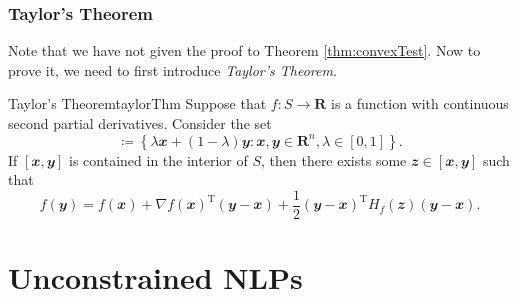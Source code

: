 \documentclass[math, code]{amznotes}
\theoremstyle{remark}
\begin{document}
\subsection{Taylor's Theorem}
Note that we have not given the proof to Theorem \ref{thm:convexTest}. Now to prove it, we need to first introduce \textit{Taylor's Theorem}.
\begin{thmbox}{Taylor's Theorem}{taylorThm}
    Suppose that $f \colon S \to \mathbf{R}$ is a function with continuous second partial derivatives. Consider the set
    \begin{displaymath}
        [\mathbfit{x}, \mathbfit{y}] \coloneqq \left\{\lambda\mathbfit{x} + (1 - \lambda)\mathbfit{y} \colon \mathbfit{x}, \mathbfit{y} \in \mathbf{R}^n, \lambda \in [0, 1]\right\}.
    \end{displaymath}
    If $[\mathbfit{x}, \mathbfit{y}]$ is contained in the interior of $S$, then there exists some $\mathbfit{z} \in [\mathbfit{x}, \mathbfit{y}]$ such that
    \begin{equation*}
        f(\mathbfit{y}) = f(\mathbfit{x}) + \nabla f(\mathbfit{x})^{\mathrm{T}}(\mathbfit{y - x}) + \frac{1}{2}(\mathbfit{y - x})^{\mathrm{T}}H_f(\mathbfit{z})(\mathbfit{y - x}).
    \end{equation*}
\end{thmbox}
\chapter{Unconstrained NLPs}
\end{document}
